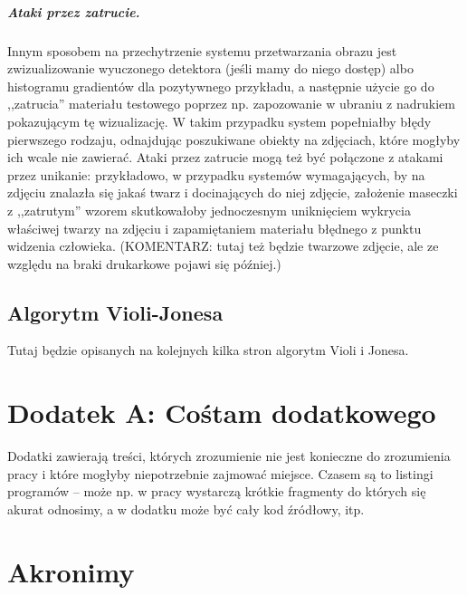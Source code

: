 \documentclass[12pt,a4paper,leqno,oneside,titlepage]{book}
\begin{document}
\paragraph{Ataki przez zatrucie.}
Innym sposobem na przechytrzenie systemu przetwarzania obrazu jest zwizualizowanie wyuczonego detektora (jeśli mamy do niego dostęp) albo histogramu gradientów dla pozytywnego przykładu, a następnie użycie go do ,,zatrucia'' materiału testowego poprzez np. zapozowanie w ubraniu z nadrukiem pokazującym tę wizualizację. W takim przypadku system popełniałby błędy pierwszego rodzaju, odnajdując poszukiwane obiekty na zdjęciach, które mogłyby ich wcale nie zawierać. Ataki przez zatrucie mogą też być połączone z atakami przez unikanie: przykładowo, w przypadku systemów wymagających, by na zdjęciu znalazła się jakaś twarz i docinających do niej zdjęcie, założenie maseczki z ,,zatrutym'' wzorem skutkowałoby jednoczesnym uniknięciem wykrycia właściwej twarzy na zdjęciu i zapamiętaniem materiału błędnego z punktu widzenia człowieka\cite{MacDonald19}. (KOMENTARZ: tutaj też będzie twarzowe zdjęcie, ale ze względu na braki drukarkowe pojawi się później.)

\section{Algorytm Violi-Jonesa}

Tutaj będzie opisanych na kolejnych kilka stron algorytm Violi i Jonesa. 

\newpage



\appendix
{}

\chapter*{Dodatek A: Cośtam dodatkowego}

Dodatki zawierają treści, których zrozumienie nie jest konieczne do zrozumienia pracy i które mogłyby niepotrzebnie zajmować miejsce. Czasem są to listingi programów -- może np. w pracy wystarczą krótkie fragmenty do których się akurat odnosimy, a w dodatku może być cały kod źródłowy, itp.

\chapter*{Akronimy}
\begin{acronym}
\end{acronym}
\end{document}
